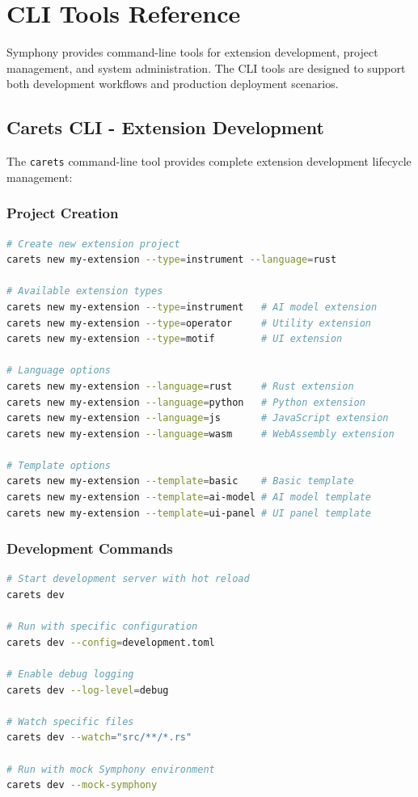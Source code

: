 \section*{CLI Tools Reference}

Symphony provides command-line tools for extension development, project management, and system administration. The CLI tools are designed to support both development workflows and production deployment scenarios.

\subsection*{Carets CLI - Extension Development}

The \texttt{carets} command-line tool provides complete extension development lifecycle management:

\subsubsection*{Project Creation}

\begin{lstlisting}[language=bash,caption={Extension Project Creation}]
# Create new extension project
carets new my-extension --type=instrument --language=rust

# Available extension types
carets new my-extension --type=instrument   # AI model extension
carets new my-extension --type=operator     # Utility extension  
carets new my-extension --type=motif        # UI extension

# Language options
carets new my-extension --language=rust     # Rust extension
carets new my-extension --language=python   # Python extension
carets new my-extension --language=js       # JavaScript extension
carets new my-extension --language=wasm     # WebAssembly extension

# Template options
carets new my-extension --template=basic    # Basic template
carets new my-extension --template=ai-model # AI model template
carets new my-extension --template=ui-panel # UI panel template
\end{lstlisting}

\subsubsection*{Development Commands}

\begin{lstlisting}[language=bash,caption={Development Workflow}]
# Start development server with hot reload
carets dev

# Run with specific configuration
carets dev --config=development.toml

# Enable debug logging
carets dev --log-level=debug

# Watch specific files
carets dev --watch="src/**/*.rs"

# Run with mock Symphony environment
carets dev --mock-symphony
\end{lstlisting}


